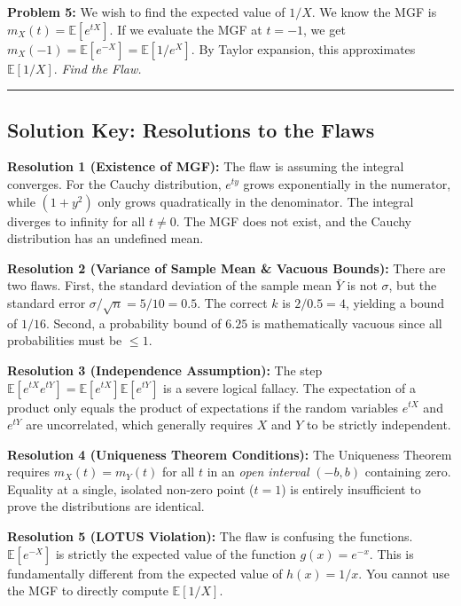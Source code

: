 \documentclass[11pt, a4paper]{article}
\theoremstyle{definition}
\theoremstyle{remark}
\newcommand{\E}{\mathbb{E}}
\begin{document}
\textbf{Problem 5:} We wish to find the expected value of $1/X$. We know the MGF is $m_X(t) = \E[e^{tX}]$. If we evaluate the MGF at $t = -1$, we get $m_X(-1) = \E[e^{-X}] = \E[1/e^X]$. By Taylor expansion, this approximates $\E[1/X]$.
\textit{Find the Flaw.}

\vspace{0.5cm}
\hrule
\vspace{0.5cm}

\subsection{Solution Key: Resolutions to the Flaws}
\textbf{Resolution 1 (Existence of MGF):} The flaw is assuming the integral converges. For the Cauchy distribution, $e^{ty}$ grows exponentially in the numerator, while $(1+y^2)$ only grows quadratically in the denominator. The integral diverges to infinity for all $t \neq 0$. The MGF does not exist, and the Cauchy distribution has an undefined mean.

\textbf{Resolution 2 (Variance of Sample Mean \& Vacuous Bounds):} There are two flaws. First, the standard deviation of the sample mean $\bar{Y}$ is not $\sigma$, but the standard error $\sigma/\sqrt{n} = 5/10 = 0.5$. The correct $k$ is $2 / 0.5 = 4$, yielding a bound of $1/16$. Second, a probability bound of $6.25$ is mathematically vacuous since all probabilities must be $\le 1$.

\textbf{Resolution 3 (Independence Assumption):} The step $\E[e^{tX} e^{tY}] = \E[e^{tX}] \E[e^{tY}]$ is a severe logical fallacy. The expectation of a product only equals the product of expectations if the random variables $e^{tX}$ and $e^{tY}$ are uncorrelated, which generally requires $X$ and $Y$ to be strictly independent.

\textbf{Resolution 4 (Uniqueness Theorem Conditions):} The Uniqueness Theorem requires $m_X(t) = m_Y(t)$ for all $t$ in an \textit{open interval} $(-b, b)$ containing zero. Equality at a single, isolated non-zero point ($t=1$) is entirely insufficient to prove the distributions are identical.

\textbf{Resolution 5 (LOTUS Violation):} The flaw is confusing the functions. $\E[e^{-X}]$ is strictly the expected value of the function $g(x) = e^{-x}$. This is fundamentally different from the expected value of $h(x) = 1/x$. You cannot use the MGF to directly compute $\E[1/X]$.
\end{document}
